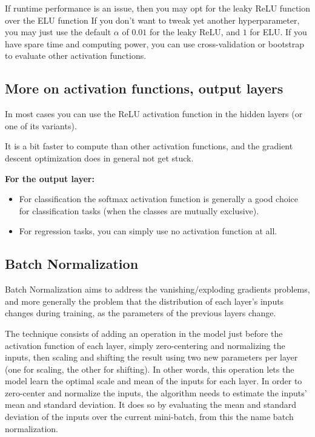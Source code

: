 \documentclass[%
oneside,                 %
final,                   %
10pt]{article}
\begin{document}
If runtime performance is an issue, then you may opt for the leaky
ReLU function over the ELU function If you don’t want to tweak yet
another hyperparameter, you may just use the default $\alpha$ of
$0.01$ for the leaky ReLU, and $1$ for ELU. If you have spare time and
computing power, you can use cross-validation or bootstrap to evaluate
other activation functions.

\subsection{More on activation functions, output layers}

In most cases you can use the ReLU activation function in the hidden
layers (or one of its variants).

It is a bit faster to compute than other activation functions, and the
gradient descent optimization does in general not get stuck.

\textbf{For the output layer:}

\begin{itemize}
\item For classification the softmax activation function is generally a good choice for classification tasks (when the classes are mutually exclusive).

\item For regression tasks, you can simply use no activation function at all.
\end{itemize}

\noindent
\subsection{Batch Normalization}

Batch Normalization aims to address the vanishing/exploding gradients
problems, and more generally the problem that the distribution of each
layer’s inputs changes during training, as the parameters of the
previous layers change.

The technique consists of adding an operation in the model just before
the activation function of each layer, simply zero-centering and
normalizing the inputs, then scaling and shifting the result using two
new parameters per layer (one for scaling, the other for shifting). In
other words, this operation lets the model learn the optimal scale and
mean of the inputs for each layer.  In order to zero-center and
normalize the inputs, the algorithm needs to estimate the inputs’ mean
and standard deviation. It does so by evaluating the mean and standard
deviation of the inputs over the current mini-batch, from this the
name batch normalization.
\end{document}

